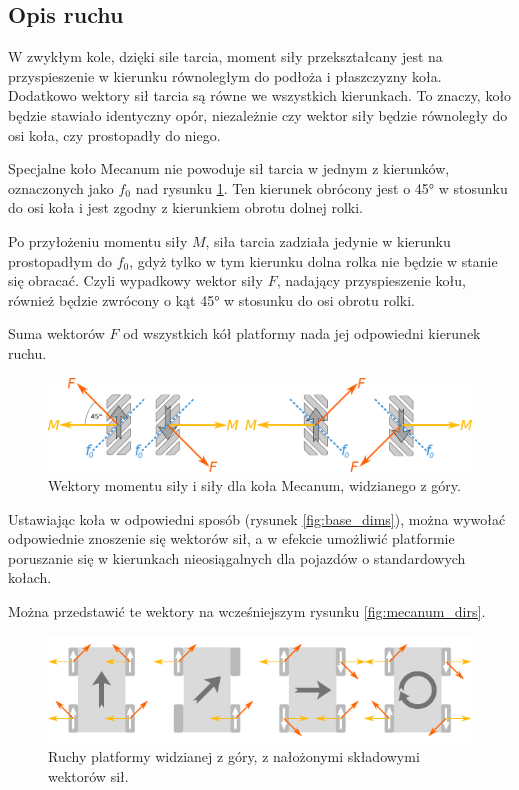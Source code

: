 	\subsection{Opis ruchu}
		\label{sec:robot_movement}
		W zwykłym kole, dzięki sile tarcia, moment siły przekształcany jest na przyspieszenie w kierunku równoległym do podłoża i płaszczyzny koła.
		Dodatkowo wektory sił tarcia są równe we wszystkich kierunkach. To znaczy, koło będzie stawiało identyczny opór, niezależnie czy wektor siły będzie równoległy do osi koła, czy prostopadły do niego.
		
		Specjalne koło Mecanum nie powoduje sił tarcia w jednym z kierunków, oznaczonych jako $f_0$ nad rysunku \ref{fig:wheel_vectors}.
		Ten kierunek obrócony jest o 45° w stosunku do osi koła i jest zgodny z kierunkiem obrotu dolnej rolki.
		
		Po przyłożeniu momentu siły $M$, siła tarcia zadziała jedynie w kierunku prostopadłym do $f_0$, gdyż tylko w tym kierunku dolna rolka nie będzie w stanie się obracać.
		Czyli wypadkowy wektor siły $F$, nadający przyspieszenie kołu, również będzie zwrócony o kąt 45° w stosunku do osi obrotu rolki.
		
		Suma wektorów $F$ od wszystkich kół platformy nada jej odpowiedni kierunek ruchu.
		
		\begin{figure}[H]
			\centering
			\includegraphics[width=\textwidth]{graphics/vectors.pdf}
			\caption{Wektory momentu siły i siły dla koła Mecanum, widzianego z góry.}
			\label{fig:wheel_vectors}
		\end{figure} 

		Ustawiając koła w odpowiedni sposób (rysunek \ref{fig:base_dims}), można wywołać odpowiednie znoszenie się wektorów sił,
		a w efekcie umożliwić platformie poruszanie się w kierunkach nieosiągalnych dla pojazdów o standardowych kołach.
		
		Można przedstawić te wektory na wcześniejszym rysunku \ref{fig:mecanum_dirs}.

		\begin{figure}[H]
			\centering
			\includegraphics[width=\textwidth]{graphics/mecanum_dirs_vect.pdf}
			\caption{Ruchy platformy widzianej z góry, z nałożonymi składowymi wektorów sił.}
			\label{fig:mecanum_dirs_vect}
		\end{figure} 

